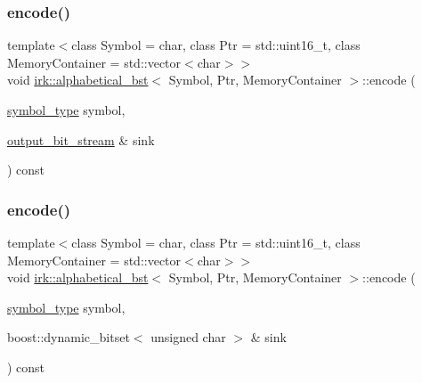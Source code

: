 \subsubsection{\texorpdfstring{encode()}{encode()}\hspace{0.1cm}{\footnotesize\ttfamily [1/3]}}
{\footnotesize\ttfamily template$<$class Symbol = char, class Ptr = std\+::uint16\+\_\+t, class Memory\+Container = std\+::vector$<$char$>$$>$ \\
void \mbox{\hyperlink{classirk_1_1alphabetical__bst}{irk\+::alphabetical\+\_\+bst}}$<$ Symbol, Ptr, Memory\+Container $>$\+::encode (\begin{DoxyParamCaption}\item[{\mbox{\hyperlink{classirk_1_1alphabetical__bst_a296ccb8fa9fa9dce3b3c3beab0a5ca28}{symbol\+\_\+type}}}]{symbol,  }\item[{\mbox{\hyperlink{classirk_1_1output__bit__stream}{output\+\_\+bit\+\_\+stream}} \&}]{sink }\end{DoxyParamCaption}) const\hspace{0.3cm}{\ttfamily [inline]}}

\mbox{\label{classirk_1_1alphabetical__bst_a921485c053b07711352642fdb638b45e}} 
\subsubsection{\texorpdfstring{encode()}{encode()}\hspace{0.1cm}{\footnotesize\ttfamily [2/3]}}
{\footnotesize\ttfamily template$<$class Symbol = char, class Ptr = std\+::uint16\+\_\+t, class Memory\+Container = std\+::vector$<$char$>$$>$ \\
void \mbox{\hyperlink{classirk_1_1alphabetical__bst}{irk\+::alphabetical\+\_\+bst}}$<$ Symbol, Ptr, Memory\+Container $>$\+::encode (\begin{DoxyParamCaption}\item[{\mbox{\hyperlink{classirk_1_1alphabetical__bst_a296ccb8fa9fa9dce3b3c3beab0a5ca28}{symbol\+\_\+type}}}]{symbol,  }\item[{boost\+::dynamic\+\_\+bitset$<$ unsigned char $>$ \&}]{sink }\end{DoxyParamCaption}) const\hspace{0.3cm}{\ttfamily [inline]}}

